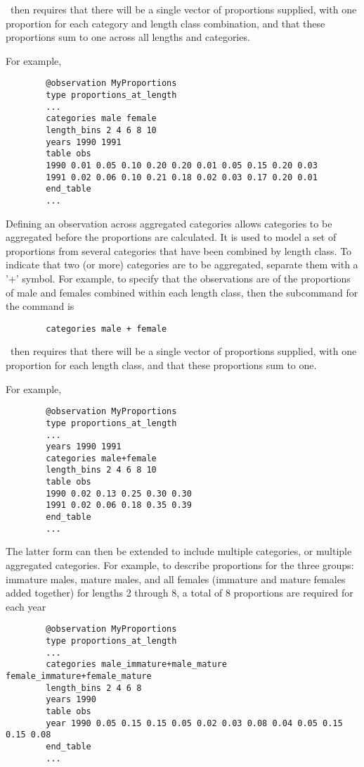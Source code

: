 \CNAME\ then requires that there will be a single vector of proportions supplied, with one proportion for each category and length class combination, and that these proportions sum to one across all lengths and categories.

For example,

{\small{\begin{verbatim}
		@observation MyProportions
		type proportions_at_length
		...
		categories male female
		length_bins 2 4 6 8 10
		years 1990 1991
		table obs
		1990 0.01 0.05 0.10 0.20 0.20 0.01 0.05 0.15 0.20 0.03
		1991 0.02 0.06 0.10 0.21 0.18 0.02 0.03 0.17 0.20 0.01
		end_table
		...
		\end{verbatim}}}

Defining an observation across aggregated categories allows categories to be aggregated before the proportions are calculated. It is used to model a set of proportions from several categories that have been combined by length class. To indicate that two (or more) categories are to be aggregated, separate them with a '+' symbol. For example, to specify that the observations are of the proportions of male and females combined within each length class, then the subcommand  for the  command is

{\small{\begin{verbatim}
		categories male + female
		\end{verbatim}}}

\CNAME\ then requires that there will be a single vector of proportions supplied, with one proportion for each length class, and that these proportions sum to one.

For example,

{\small{\begin{verbatim}
		@observation MyProportions
		type proportions_at_length
		...
		years 1990 1991
		categories male+female
		length_bins 2 4 6 8 10
		table obs
		1990 0.02 0.13 0.25 0.30 0.30
		1991 0.02 0.06 0.18 0.35 0.39
		end_table
		...
		\end{verbatim}}}

The latter form can then be extended to include multiple categories, or multiple aggregated categories. For example, to describe proportions for the three groups: immature males, mature males, and all females (immature and mature females added together) for lengths 2 through 8, a total of 8 proportions are required for each year

{\small{\begin{verbatim}
		@observation MyProportions
		type proportions_at_length
		...
		categories male_immature+male_mature female_immature+female_mature
		length_bins 2 4 6 8
		years 1990
		table obs
		year 1990 0.05 0.15 0.15 0.05 0.02 0.03 0.08 0.04 0.05 0.15 0.15 0.08
		end_table
		...
		\end{verbatim}}}

